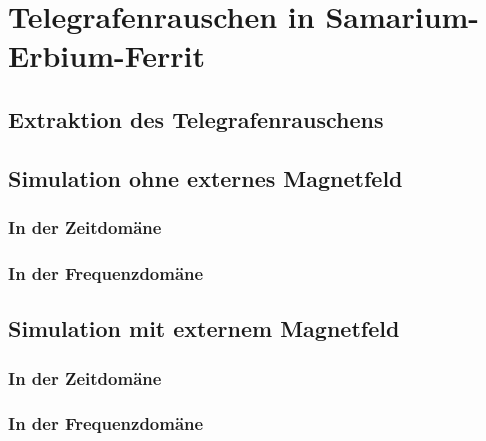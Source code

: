 \documentclass[main.tex]{subfiles}
\begin{document}
\section{Telegrafenrauschen in Samarium-Erbium-Ferrit}

\subsection[short]{Extraktion des Telegrafenrauschens}

\subsection[short]{Simulation ohne externes Magnetfeld}
\subsubsection[short]{In der Zeitdomäne}
\subsubsection[short]{In der Frequenzdomäne}

\subsection[short]{Simulation mit externem Magnetfeld}
\subsubsection[short]{In der Zeitdomäne}
\subsubsection[short]{In der Frequenzdomäne}
\end{document}
